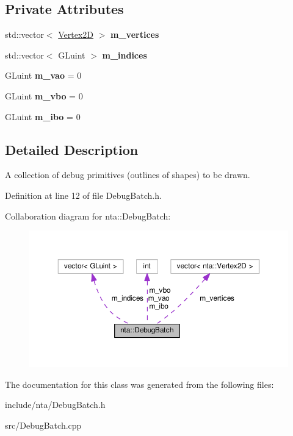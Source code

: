 \subsection*{Private Attributes}
\begin{DoxyCompactItemize}
\item 
\mbox{\label{classnta_1_1DebugBatch_a7c699660499350f5717a13dc2266cd9c}} 
std\+::vector$<$ \hyperlink{structnta_1_1Vertex2D}{Vertex2D} $>$ {\bfseries m\+\_\+vertices}
\item 
\mbox{\label{classnta_1_1DebugBatch_a1c0359676583c9c60d29b74b909939ee}} 
std\+::vector$<$ G\+Luint $>$ {\bfseries m\+\_\+indices}
\item 
\mbox{\label{classnta_1_1DebugBatch_a13089a13e5a589c9185c566e2957d0b5}} 
G\+Luint {\bfseries m\+\_\+vao} = 0
\item 
\mbox{\label{classnta_1_1DebugBatch_a8d3d799f71618a40d9403eda7f62a7de}} 
G\+Luint {\bfseries m\+\_\+vbo} = 0
\item 
\mbox{\label{classnta_1_1DebugBatch_ae85fcc91c2121dd5e438e73dfdf2c638}} 
G\+Luint {\bfseries m\+\_\+ibo} = 0
\end{DoxyCompactItemize}


\subsection{Detailed Description}
A collection of debug primitives (outlines of shapes) to be drawn. 

Definition at line 12 of file Debug\+Batch.\+h.



Collaboration diagram for nta\+:\+:Debug\+Batch\+:
\nopagebreak
\begin{figure}[H]
\begin{center}
\leavevmode
\includegraphics[width=350pt]{db/d88/classnta_1_1DebugBatch__coll__graph}
\end{center}
\end{figure}


The documentation for this class was generated from the following files\+:\begin{DoxyCompactItemize}
\item 
include/nta/Debug\+Batch.\+h\item 
src/Debug\+Batch.\+cpp\end{DoxyCompactItemize}

